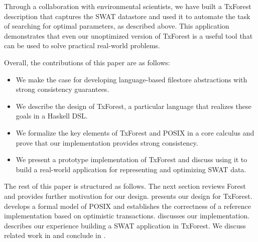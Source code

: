 %
%
Through a collaboration with environmental scientists, we have built a
TxForest description that captures the SWAT datastore and used it to
automate the task of searching for optimal parameters, as described
above. This application demonstrates that even our unoptimized version
of TxForest is a useful tool that can be used to solve practical
real-world problems. 

%
%
Overall, the contributions of this paper are as follows:
\begin{itemize}
\item We make the case for developing language-based filestore
  abstractions with strong consistency guarantees.
\item We describe the design of TxForest, a particular language that
  realizes these goals in a Haskell DSL.
\item We formalize the key elements of TxForest and POSIX in a core
  calculus and prove that our implementation provides strong
  consistency.
\item We present a prototype implementation of TxForest and discuss
  using it to build a real-world application for representing and
  optimizing SWAT data. 
\end{itemize}
%
The rest of this paper is structured as follows. The next section
reviews Forest and provides further motivation for our
design.  presents our design for
TxForest.  develops a formal model of
POSIX and establishes the correctness of a reference implementation
based on optimistic transactions. 
discusses our implementation.  describes our
experience building a SWAT application in TxForest. We discuss related
work in  and conclude in
.
